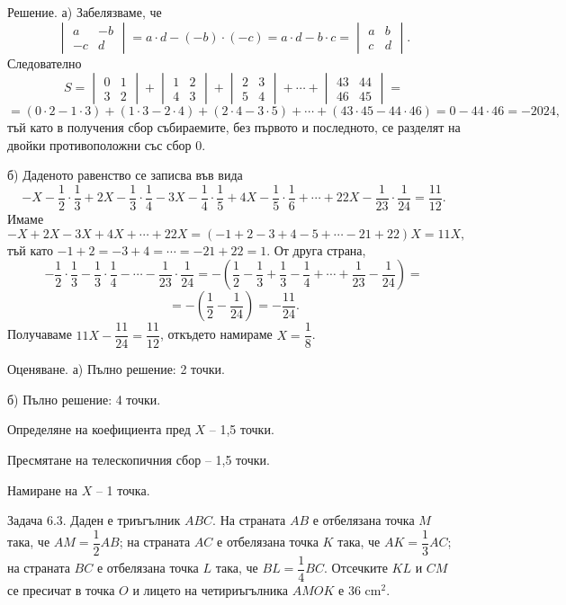 Решение. а) Забелязваме, че
$$
\begin{vmatrix}a&-b\\-c&d\end{vmatrix}=a\cdot d-(-b)\cdot(-c)=a\cdot d-b\cdot c=\begin{vmatrix}a&b\\c&d\end{vmatrix}.
$$
Следователно
$$
S=\begin{vmatrix}0&1\\3&2\end{vmatrix}+\begin{vmatrix}1&2\\4&3\end{vmatrix}+\begin{vmatrix}2&3\\5&4\end{vmatrix}+\cdots+\begin{vmatrix}43&44\\46&45\end{vmatrix}=
$$
$$
=(0\cdot2-1\cdot3)+(1\cdot3-2\cdot4)+(2\cdot4-3\cdot5)+\cdots+(43\cdot45-44\cdot46)=0-44\cdot46=-2024,
$$
тъй като в получения сбор събираемите, без първото и последното, се разделят на двойки противоположни със сбор 0.

б) Даденото равенство се записва във вида
$$
-X-\frac12\cdot\frac13+2X-\frac13\cdot\frac14-3X-\frac14\cdot\frac15+4X-\frac15\cdot\frac16+\cdots+22X-\frac1{23}\cdot\frac1{24}=\frac{11}{12}.
$$
Имаме
$$
-X+2X-3X+4X+\cdots+22X=(-1+2-3+4-5+\cdots-21+22)X=11X,
$$
тъй като $-1+2=-3+4=\cdots=-21+22=1$. От друга страна,
$$
-\frac12\cdot\frac13-\frac13\cdot\frac14-\cdots-\frac1{23}\cdot\frac1{24}=-\left(\frac12-\frac13+\frac13-\frac14+\cdots+\frac1{23}-\frac1{24}\right)=
$$
$$
=-\left(\frac12-\frac1{24}\right)=-\frac{11}{24}.
$$
Получаваме $11X-\dfrac{11}{24}=\dfrac{11}{12}$, откъдето намираме $X=\dfrac18$.

Оценяване. а) Пълно решение: 2 точки.

б) Пълно решение: 4 точки.

Определяне на коефициента пред $X$ – 1,5 точки.

Пресмятане на телескопичния сбор – 1,5 точки.

Намиране на $X$ – 1 точка.

Задача 6.3. Даден е триъгълник $ABC$. На страната $AB$ е отбелязана точка $M$ така, че $AM=\dfrac12AB$; на страната $AC$ е отбелязана точка $K$ така, че $AK=\dfrac13AC$; на страната $BC$ е отбелязана точка $L$ така, че $BL=\dfrac14BC$. Отсечките $KL$ и $CM$ се пресичат в точка $O$ и лицето на четириъгълника $AMOK$ е 36 cm$^2$.

